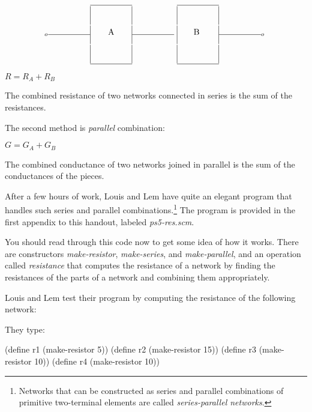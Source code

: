 $$\vbox{\halign{#&#&#&#&#\cr
&\vbox{\hrule width5em}& &\vbox{\hrule width5em}& \cr
&\vrule height11pt depth11pt\hfil\vrule height11pt depth11pt& &\vrule height11pt depth11pt\hfil\vrule height11pt depth11pt& \cr
$_o$\vbox{\hrule width5em}&\vrule height11pt depth11pt\hfil A\hfil \vrule height11pt depth11pt&\vbox{\hrule width5em} &\vrule height11pt depth11pt\hfil B \hfil\vrule height11pt depth11pt&\vbox{\hrule width5em}$_o$ \cr
&\vrule height11pt depth11pt\hfil\vrule height11pt depth11pt& &\vrule height11pt depth11pt\hfil\vrule height11pt depth11pt& \cr
&\vbox{\hrule width5em}& &\vbox{\hrule width5em}& \cr}}$$

\centerline{$R = R_A + R_B$}

The combined resistance of two networks connected in series is the sum
of the resistances.

The second method is {\it parallel} combination: 

\begin{minipage}[t]{\linewidth}
\vspace{3in}

\centerline{$G = G_A + G_B$}
\end{minipage}

The combined conductance of two networks joined in parallel is the sum
of the conductances of the pieces.

After a few hours of work, Louis and Lem have quite an
elegant program that handles such series and parallel
combinations.\footnote{Networks that can be constructed as series and
parallel combinations of primitive two-terminal elements are called
{\it series-parallel networks}.} The program is provided in the first
appendix to this handout, labeled {\it ps5-res.scm}.

You should read through this code now to get some idea of how it
works.  There are constructors {\it make-resistor}, {\it make-series}, and
{\it make-parallel}, and an operation called {\it resistance} that
computes the resistance of a network by finding the resistances of the
parts of a network and combining them appropriately.

Louis and Lem test their program by computing the resistance of the
following network:

\vspace{3in}

They type:

\beginlisp
(define r1 (make-resistor  5))
(define r2 (make-resistor 15))
(define r3 (make-resistor 10))
(define r4 (make-resistor 10))

